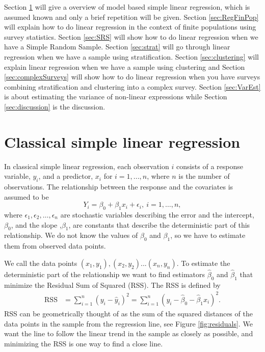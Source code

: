 \documentclass{article}
\begin{document}
Section \ref{sec:modLinReg} will give a overview of model based simple
linear regression, which is assumed known and only a brief repetition will be given.
Section \ref{sec:RegFinPop} will explain how to do linear regression in the context of finite
populations using survey statistics. Section \ref{sec:SRS} will show how to do linear
regression when we have a Simple Random Sample. Section \ref{sec:strat} will go through
linear regression when we have a sample using stratification. Section \ref{sec:clustering} will
explain linear regression when we have a sample using clustering and Section \ref{sec:complexSurveys}
will show how to do linear regression when you have surveys combining
stratification and clustering into a complex survey. Section \ref{sec:VarEst} is
about estimating the variance of non-linear expressions while Section
\ref{sec:discussion} is the discussion.

\section{Classical simple linear regression} \label{sec:modLinReg}

In classical simple linear regression, each observation \(i\) consists of a
response variable, \(y_i\), and a predictor, \(x_i\) for \(i = 1, ..., n\), where \(n\) is the number of observations. The
relationship between the response and the covariates is assumed to be
\begin{equation*}
Y_i = \beta_0 + \beta_1 x_i + \epsilon_i,\ i = 1, \dots, n,
\end{equation*}
where \(\epsilon_1, \epsilon_2, \dots, \epsilon_n\) are stochastic variables
describing the error and the intercept, \(\beta_0\), and the slope ,\(\beta_1\),
are constants that describe the deterministic part of this relationship.
We do not know the values of \(\beta_0\) and \(\beta_1\), so we have to estimate
them from observed data points.

We call the data points \((x_1, y_1), (x_2, y_2)
... (x_n, y_n)\). To estimate the deterministic part of the relationship we want
to find estimators \(\hat{\beta}_0\) and \(\hat{\beta}_1\) that minimize the
Residual Sum of Squared (RSS). The RSS is defined by
\begin{align*}
  \mathrm{RSS} &= \sum_{i = 1}^n \left( y_i - \hat{y}_i \right)^2 
  = \sum_{i = 1}^n \left( y_i - \hat{\beta}_0 - \hat{\beta}_1 x_i \right)^2.
\end{align*}
RSS can be geometrically thought of as the sum of the squared distances of
the data points in the sample from the regression line, see Figure
\ref{fig:residuals}. We want the line to follow the linear trend in the sample
as closely as possible, and minimizing the RSS is one way to find a close line.
\end{document}

